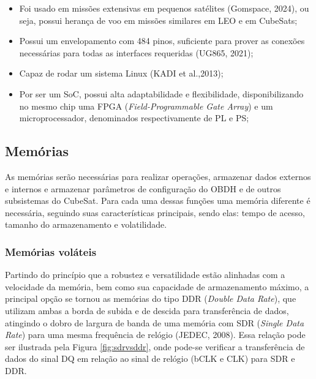 \begin{itemize}
	\item Foi usado em missões extensivas em pequenos satélites (Gomspace, 2024), ou seja, possui herança de voo em missões similares em LEO e em CubeSats;
	\item Possui um envelopamento com 484 pinos, suficiente para prover as conexões necessárias para todas as interfaces requeridas (UG865, 2021);
	\item Capaz de rodar um sistema Linux (KADI et al.,2013);
	\item Por ser um SoC, possui alta adaptabilidade e flexibilidade, disponibilizando no mesmo chip uma FPGA (\textit{Field-Programmable Gate Array}) e um microprocessador, denominados respectivamente de PL e PS;
\end{itemize}

\subsection{Memórias}

As memórias serão necessárias para realizar operações, armazenar dados externos e internos e armazenar parâmetros de configuração do OBDH e de outros subsistemas do CubeSat. Para cada uma dessas funções uma memória diferente é necessária, seguindo suas características principais, sendo elas: tempo de acesso, tamanho do armazenamento e volatilidade.

\subsubsection{Memórias voláteis}

Partindo do princípio que a robustez e versatilidade estão alinhadas com a velocidade da memória, bem como sua capacidade de armazenamento máximo, a principal opção se tornou as memórias do tipo DDR (\textit{Double Data Rate}), que utilizam ambas a borda de subida e de descida para transferência de dados, atingindo o dobro de largura de banda de uma memória com SDR (\textit{Single Data Rate}) para uma mesma frequência de relógio (JEDEC, 2008). Essa relação pode ser ilustrada pela Figura \ref{fig:sdrvsddr}, onde pode-se verificar a transferência de dados do sinal DQ em relação ao sinal de relógio (bCLK e CLK) para SDR e DDR.

